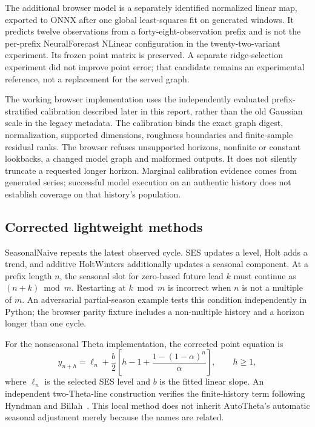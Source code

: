 \documentclass[11pt,a4paper]{article}
\begin{document}
The additional browser model is a separately identified normalized linear map, exported to ONNX after one global least-squares fit on generated windows. It predicts twelve observations from a forty-eight-observation prefix and is not the per-prefix NeuralForecast NLinear configuration in the twenty-two-variant experiment. Its frozen point matrix is preserved. A separate ridge-selection experiment did not improve point error; that candidate remains an experimental reference, not a replacement for the served graph.

The working browser implementation uses the independently evaluated prefix-stratified calibration described later in this report, rather than the old Gaussian scale in the legacy metadata. The calibration binds the exact graph digest, normalization, supported dimensions, roughness boundaries and finite-sample residual ranks. The browser refuses unsupported horizons, nonfinite or constant lookbacks, a changed model graph and malformed outputs. It does not silently truncate a requested longer horizon. Marginal calibration evidence comes from generated series; successful model execution on an authentic history does not establish coverage on that history's population.

\subsection{Corrected lightweight methods}
SeasonalNaive repeats the latest observed cycle. SES updates a level, Holt adds a trend, and additive HoltWinters additionally updates a seasonal component. At a prefix length $n$, the seasonal slot for zero-based future lead $k$ must continue as $(n+k)\bmod m$. Restarting at $k\bmod m$ is incorrect when $n$ is not a multiple of $m$. An adversarial partial-season example tests this condition independently in Python; the browser parity fixture includes a non-multiple history and a horizon longer than one cycle.

For the nonseasonal Theta implementation, the corrected point equation is
\begin{equation}
\widehat y_{n+h}=\ell_n+\frac{b}{2}\left[h-1+\frac{1-(1-\alpha)^n}{\alpha}\right],\qquad h\geq1,
\end{equation}
where $\ell_n$ is the selected SES level and $b$ is the fitted linear slope. An independent two-Theta-line construction verifies the finite-history term following Hyndman and Billah~\cite{theta}. This local method does not inherit AutoTheta's automatic seasonal adjustment merely because the names are related.
\end{document}
